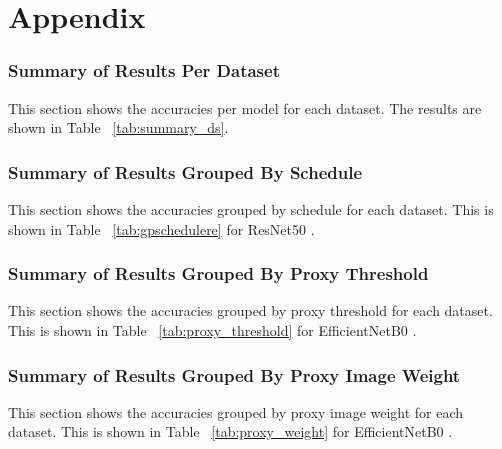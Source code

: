 \chapter{Appendix} \label{ch:appendix}
\subsection{Summary of Results Per Dataset}
This section shows the accuracies per model for each dataset. The results are shown in Table ~\ref{tab:summary_ds}.


\subsection{Summary of Results Grouped By Schedule}
This section shows the accuracies grouped by schedule for each dataset. This is shown in Table ~\ref{tab:gpschedulere} for ResNet50 \cite{heDeepResidualLearning2016}.



\subsection{Summary of Results Grouped By Proxy Threshold}
This section shows the accuracies grouped by proxy threshold for each dataset. This is shown in Table ~\ref{tab:proxy_threshold} for EfficientNetB0 \cite{tanEfficientnetRethinkingModel2019}.


\subsection{Summary of Results Grouped By Proxy Image Weight}
This section shows the accuracies grouped by proxy image weight for each dataset. This is shown in Table ~\ref{tab:proxy_weight} for EfficientNetB0 \cite{tanEfficientnetRethinkingModel2019}.
